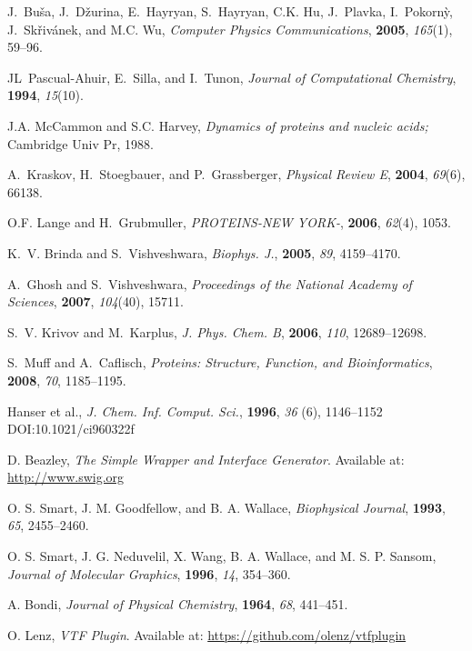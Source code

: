 \documentclass[11pt,twoside,onecolumn,a4paper,openright,notitlepage]{book}[2001/04/21]
\begin{document}
\begin{thebibliography}{10}
J.~Bu{\v{s}}a, J.~D{\v{z}}urina, E.~Hayryan, S.~Hayryan, C.K. Hu, J.~Plavka,
  I.~Pokorn{\`y}, J.~Sk{\v{r}}iv{\'a}nek, and M.C. Wu, {\em Computer Physics
  Communications}, {\bf 2005}, {\em 165}(1), 59--96.

JL~Pascual-Ahuir, E.~Silla, and I.~Tunon, {\em Journal of Computational
  Chemistry}, {\bf 1994}, {\em 15}(10).

J.A. McCammon and S.C. Harvey, {\em {Dynamics of proteins and nucleic acids};}
\newblock Cambridge Univ Pr, 1988.

A.~Kraskov, H.~Stoegbauer, and P.~Grassberger, {\em Physical Review E}, {\bf
  2004}, {\em 69}(6), 66138.

O.F. Lange and H.~Grubmuller, {\em PROTEINS-NEW YORK-}, {\bf 2006}, {\em
  62}(4), 1053.

K.~V. Brinda and S.~Vishveshwara, {\em Biophys. J.}, {\bf 2005}, {\em 89},
  4159--4170.

A.~Ghosh and S.~Vishveshwara, {\em Proceedings of the National Academy of
  Sciences}, {\bf 2007}, {\em 104}(40), 15711.

S.~V. Krivov and M.~Karplus, {\em J. Phys. Chem. B}, {\bf 2006}, {\em 110},
  12689--12698.

S.~Muff and A.~Caflisch, {\em Proteins: Structure, Function, and
  Bioinformatics}, {\bf 2008}, {\em 70}, 1185--1195.

Hanser et al., {\em J. Chem. Inf. Comput. Sci.}, {\bf 1996}, {\em 36} (6), 1146--1152 DOI:10.1021/ci960322f

D. Beazley, {\em The Simple Wrapper and Interface Generator}. Available at: \url{http://www.swig.org}

O. S. Smart, J. M. Goodfellow, and B. A. Wallace, {\em Biophysical Journal}, {\bf 1993}, {\em 65}, 2455--2460.

O. S. Smart, J. G. Neduvelil, X. Wang, B. A. Wallace, and M. S. P. Sansom, {\em Journal of Molecular Graphics}, {\bf 1996}, {\em 14}, 354--360.

A. Bondi, {\em Journal of Physical Chemistry}, {\bf 1964}, {\em 68}, 441--451.

O. Lenz, {\em VTF Plugin}. Available at: \url{https://github.com/olenz/vtfplugin}


\end{thebibliography}

\clearpage

\end{document}
